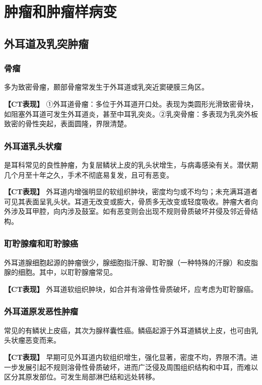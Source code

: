 \section{肿瘤和肿瘤样病变}

\subsection{外耳道及乳突肿瘤}

\subsubsection{骨瘤}

多为致密骨瘤，颞部骨瘤常发生于外耳道或乳突近窦硬膜三角区。

\textbf{【CT表现】}
①外耳道骨瘤：多位于外耳道开口处。表现为类圆形光滑致密骨块，如阻塞外耳道可发生外耳道炎，甚至中耳乳突炎。②乳突骨瘤：多表现为乳突外板致密的骨性突起，表面圆隆，界限清楚。

\subsubsection{外耳道乳头状瘤}

是耳科常见的良性肿瘤，为复层鳞状上皮的乳头状增生，与病毒感染有关。潜伏期几个月至十年之久，手术不彻底易复发，且可有恶变。

\textbf{【CT表现】}
外耳道内增强明显的软组织肿块，密度均匀或不均匀；未充满耳道者可见其表面呈乳头状。耳道无改变或膨大，骨质多无改变或轻度吸收。肿瘤大者向外涉及耳甲腔，向内涉及鼓室。如有恶变则会出现不规则骨质破坏并侵及邻近骨结构。

\subsubsection{耵聍腺瘤和耵聍腺癌}

外耳道腺细胞起源的肿瘤很少，腺细胞指汗腺、耵聍腺（一种特殊的汗腺）和皮脂腺的细胞。其中，以耵聍腺瘤常见。

\textbf{【CT表现】}
外耳道软组织肿块，如合并有溶骨性骨质破坏，应考虑为耵聍腺癌。

\subsubsection{外耳道原发恶性肿瘤}

常见的有鳞状上皮癌，其次为腺样囊性癌。鳞癌起源于外耳道鳞状上皮，也可由乳头状瘤恶变而来。

\textbf{【CT表现】}
早期可见外耳道内软组织增生，强化显著，密度不均，界限不清。进一步发展引起不规则溶骨性骨质破坏，进而广泛侵及周围组织结构和中耳，而难以区分其原发部位。可发生局部淋巴结和远处转移。

